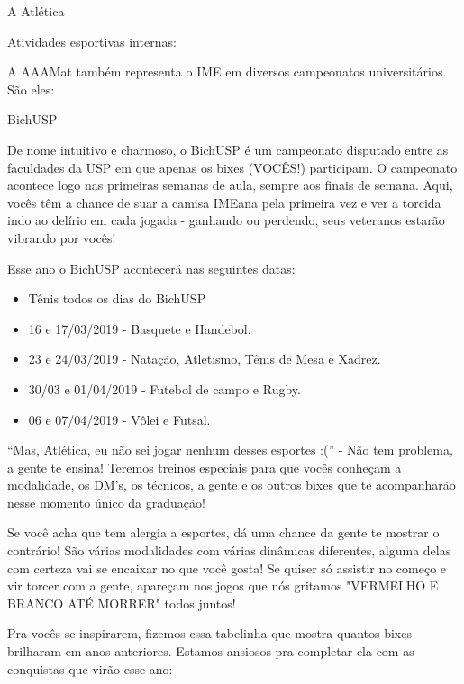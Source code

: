 \begin{secao}{A Atlética}
\begin{subsecao}{Atividades esportivas internas:}
\end{subsecao}

A AAAMat também representa o IME em diversos campeonatos universitários. São
eles:

\begin{subsecao}{BichUSP}

De nome intuitivo e charmoso, o BichUSP é um campeonato disputado entre as
faculdades da USP em que apenas os bixes (VOCÊS!) participam. O campeonato
acontece logo nas primeiras semanas de aula, sempre aos finais de semana. Aqui,
vocês têm a chance de suar a camisa IMEana pela primeira vez e ver a torcida
indo ao delírio em cada jogada - ganhando ou perdendo, seus veteranos estarão
vibrando por vocês!

Esse ano o BichUSP acontecerá nas seguintes datas:

\begin{itemize}
  \item Tênis todos os dias do BichUSP
  \item 16 e 17/03/2019 - Basquete e Handebol.
  \item 23 e 24/03/2019 - Natação, Atletismo, Tênis de Mesa e Xadrez.
  \item 30/03 e 01/04/2019 - Futebol de campo e Rugby.
  \item 06 e 07/04/2019 - Vôlei e Futsal.  
\end{itemize}

``Mas, Atlética, eu não sei jogar nenhum desses esportes :('' - Não tem
problema, a gente te ensina! Teremos treinos especiais para que vocês conheçam
a modalidade, os DM’s, os técnicos, a gente e os outros bixes que te
acompanharão nesse momento único da graduação!

Se você acha que tem alergia a esportes, dá uma chance da gente te mostrar o
contrário! São várias modalidades com várias dinâmicas diferentes, alguma delas
com certeza vai se encaixar no que você gosta! Se quiser só assistir no começo
e vir torcer com a gente, apareçam nos jogos que nós gritamos "VERMELHO E
BRANCO ATÉ MORRER" todos juntos!

Pra vocês se inspirarem, fizemos essa tabelinha que mostra quantos bixes
brilharam em anos anteriores. Estamos ansiosos pra completar ela com as
conquistas que virão esse ano:


\end{subsecao}
\end{secao}
